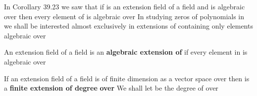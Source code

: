 \documentclass[11pt,oneside]{article}
\begin{document}
\fi
\renewcommand{\BookFooter}{Section 40 Algebraic Extensions}
\ifdefined\BookMaster\else\setcounter{page}{319}\fi
\BookNarrativetrue

\begin{BookBody}



\noindent In Corollary 39.23 we saw that if  is an extension field of a field  and  is algebraic over  then every element of  is algebraic over  In studying zeros of polynomials in  we shall be interested almost exclusively in extensions of  containing only elements algebraic over 

 An extension field  of a field  is an\textbf{ algebraic extension of}  if every element in  is algebraic over \BookEnd{\blacksquare}

 If an extension field  of a field  is of finite dimension  as a vector space over  then  is a\textbf{ finite extension of degree}  \textbf{over}  We shall let \BookInline{[E:F]} be the degree  of  over \BookEnd{\blacksquare}

\end{BookBody}

\BookNarrativetrue
\end{document}
